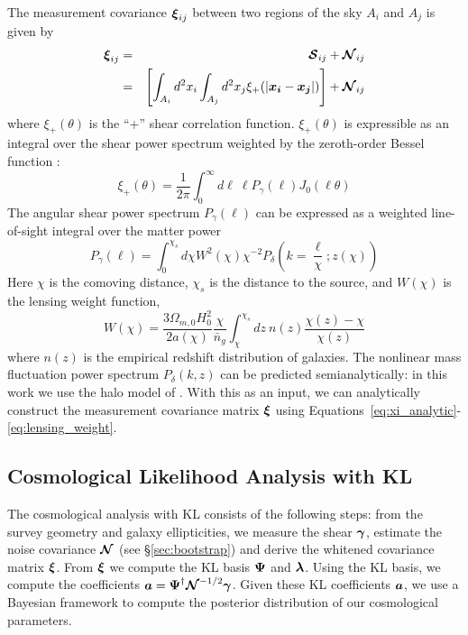 The measurement covariance $\boldsymbol{\xi}_{ij}$ between two regions of the
sky $A_i$ and $A_j$ is given by
\begin{eqnarray}
  \label{eq:xi_analytic}
  \boldsymbol{\xi}_{ij} 
  &=& \boldsymbol{\mathcal{S}}_{ij} + \boldsymbol{\mathcal{N}}_{ij} \nonumber\\
  &=& \left[\int_{A_i}d^2x_i\int_{A_j}d^2x_j 
    \xi_+(|\boldsymbol{x_i}-\boldsymbol{x_j}|)\right]
  + \boldsymbol{\mathcal{N}}_{ij}
\end{eqnarray}
where $\xi_+(\theta)$ is the ``+'' shear correlation function. 
$\xi_+(\theta)$ is expressible as an integral over the shear power spectrum
weighted by the zeroth-order Bessel function
\citep[see, e.g.][]{Schneider02}:
\begin{equation}
  \label{eq:xi_plus_def}
  \xi_+(\theta) 
  = \frac{1}{2\pi} \int_0^\infty d\ell\ \ell P_\gamma(\ell) J_0(\ell\theta)
\end{equation}
The angular shear power spectrum $P_\gamma(\ell)$ can be expressed as a
weighted line-of-sight integral over the matter power
\begin{equation}
  P_\gamma(\ell) = \int_0^{\chi_s}d\chi W^2(\chi)\chi^{-2}
  P_\delta\left(k=\frac{\ell}{\chi};z(\chi)\right)
\end{equation}
Here $\chi$ is the comoving distance, $\chi_s$ is the distance to the
source, and $W(\chi)$ is the lensing weight function,
\begin{equation}
  \label{eq:lensing_weight}
  W(\chi) = \frac{3\Omega_{m,0}H_0^2}{2a(\chi)}\frac{\chi}{\bar{n}_g}
  \int_{\chi}^{\chi_s}dz\ n(z) \frac{\chi(z)-\chi}{\chi(z)}
\end{equation}
where $n(z)$ is the empirical redshift distribution of galaxies.
The nonlinear mass fluctuation power spectrum $P_\delta(k, z)$ can be
predicted semianalytically: in this work we use the halo model of
\citet{Smith03}.  With this as an input, we can analytically
construct the measurement covariance matrix $\boldsymbol{\xi}$ using 
Equations~\ref{eq:xi_analytic}-\ref{eq:lensing_weight}.

\subsection{Cosmological Likelihood Analysis with KL}
The cosmological analysis with KL consists of the following steps:
from the survey geometry and galaxy ellipticities, we measure the
shear $\boldsymbol{\gamma}$, estimate the noise covariance
$\boldsymbol{\mathcal{N}}$ (see \S\ref{sec:bootstrap}) and derive
the whitened covariance matrix $\boldsymbol{\xi}$. 
From $\boldsymbol{\xi}$ we compute the KL basis $\boldsymbol{\Psi}$ and $\boldsymbol{\lambda}$.
Using the KL basis, we compute the coefficients
$\boldsymbol{a} = \boldsymbol{\Psi}^\dagger \boldsymbol{\mathcal{N}}^{-1/2} \boldsymbol{\gamma}$.
Given these KL coefficients $\boldsymbol{a}$, we use a Bayesian framework to
compute the posterior distribution of our cosmological parameters.

